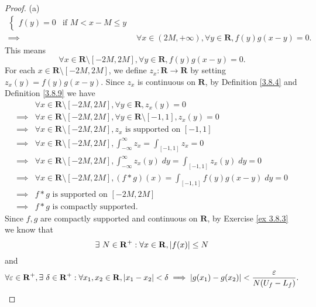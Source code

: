 \begin{proof}{(a)}
\begin{align*}
\begin{cases}
                                                                              f(y) = 0     & \text{if } M < x - M \leq y
                                                                          \end{cases} \\
        \implies & \forall x \in (2M, +\infty), \forall y \in \mathbf{R}, f(y) g(x - y) = 0.
    \end{align*}
    This means
    \[
        \forall x \in \mathbf{R} \setminus [-2M, 2M], \forall y \in \mathbf{R}, f(y) g(x - y) = 0.
    \]
    For each \(x \in \mathbf{R} \setminus [-2M, 2M]\), we define \(z_x : \mathbf{R} \to \mathbf{R}\) by setting \(z_x(y) = f(y) g(x - y)\).
    Since \(z_x\) is continuous on \(\mathbf{R}\), by Definition \ref{3.8.4} and Definition \ref{3.8.9} we have
    \begin{align*}
                 & \forall x \in \mathbf{R} \setminus [-2M, 2M], \forall y \in \mathbf{R}, z_x(y) = 0                                 \\
        \implies & \forall x \in \mathbf{R} \setminus [-2M, 2M], \forall y \in \mathbf{R} \setminus [-1, 1], z_x(y) = 0               \\
        \implies & \forall x \in \mathbf{R} \setminus [-2M, 2M], z_x \text{ is supported on } [-1, 1]                                 \\
        \implies & \forall x \in \mathbf{R} \setminus [-2M, 2M], \int_{-\infty}^\infty z_x = \int_{[-1, 1]} z_x = 0                   \\
        \implies & \forall x \in \mathbf{R} \setminus [-2M, 2M], \int_{-\infty}^\infty z_x(y) \; dy = \int_{[-1, 1]} z_x(y) \; dy = 0 \\
        \implies & \forall x \in \mathbf{R} \setminus [-2M, 2M], (f * g)(x) = \int_{[-1, 1]} f(y) g(x - y) \; dy = 0                  \\
        \implies & f * g \text{ is supported on } [-2M, 2M]                                                                           \\
        \implies & f * g \text{ is compactly supported}.
    \end{align*}
    Since \(f, g\) are compactly supported and continuous on \(\mathbf{R}\), by Exercise \ref{ex 3.8.3} we know that
    \[
        \exists\ N \in \mathbf{R}^+ : \forall x \in \mathbf{R}, \abs*{f(x)} \leq N
    \]
    and
    \[
        \forall \varepsilon \in \mathbf{R}^+, \exists\ \delta \in \mathbf{R}^+ : \forall x_1, x_2 \in \mathbf{R}, \abs*{x_1 - x_2} < \delta \implies \abs*{g(x_1) - g(x_2)} < \frac{\varepsilon}{N (U_f - L_f)}.
\]
\end{proof}

